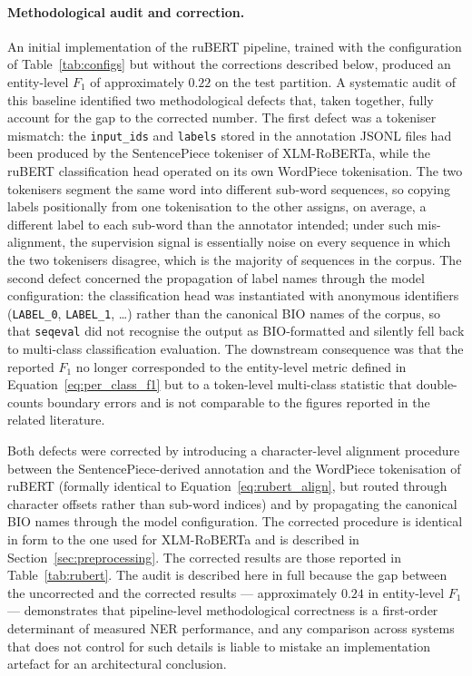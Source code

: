 \paragraph{Methodological audit and correction.} An initial implementation of the ruBERT pipeline, trained with the configuration of Table~\ref{tab:configs} but without the corrections described below, produced an entity-level $F_1$ of approximately $0.22$ on the test partition. A systematic audit of this baseline identified two methodological defects that, taken together, fully account for the gap to the corrected number. The first defect was a tokeniser mismatch: the \texttt{input\_ids} and \texttt{labels} stored in the annotation JSONL files had been produced by the SentencePiece tokeniser of XLM-RoBERTa, while the ruBERT classification head operated on its own WordPiece tokenisation. The two tokenisers segment the same word into different sub-word sequences, so copying labels positionally from one tokenisation to the other assigns, on average, a different label to each sub-word than the annotator intended; under such mis-alignment, the supervision signal is essentially noise on every sequence in which the two tokenisers disagree, which is the majority of sequences in the corpus. The second defect concerned the propagation of label names through the model configuration: the classification head was instantiated with anonymous identifiers (\texttt{LABEL\_0}, \texttt{LABEL\_1}, \ldots) rather than the canonical BIO names of the corpus, so that \texttt{seqeval} did not recognise the output as BIO-formatted and silently fell back to multi-class classification evaluation. The downstream consequence was that the reported $F_1$ no longer corresponded to the entity-level metric defined in Equation~\eqref{eq:per_class_f1} but to a token-level multi-class statistic that double-counts boundary errors and is not comparable to the figures reported in the related literature.

Both defects were corrected by introducing a character-level alignment procedure between the SentencePiece-derived annotation and the WordPiece tokenisation of ruBERT (formally identical to Equation~\eqref{eq:rubert_align}, but routed through character offsets rather than sub-word indices) and by propagating the canonical BIO names through the model configuration. The corrected procedure is identical in form to the one used for XLM-RoBERTa and is described in Section~\ref{sec:preprocessing}. The corrected results are those reported in Table~\ref{tab:rubert}. The audit is described here in full because the gap between the uncorrected and the corrected results --- approximately $0.24$ in entity-level $F_1$ --- demonstrates that pipeline-level methodological correctness is a first-order determinant of measured NER performance, and any comparison across systems that does not control for such details is liable to mistake an implementation artefact for an architectural conclusion.

